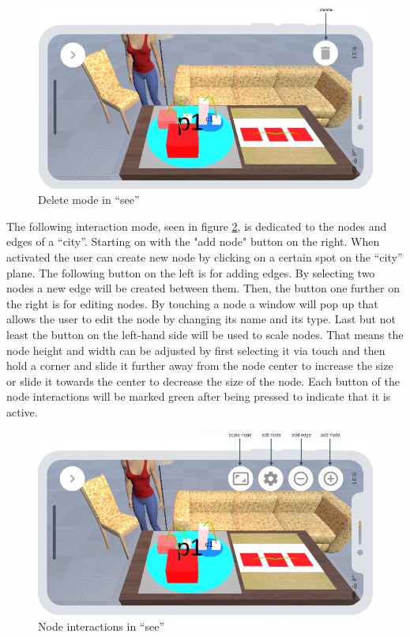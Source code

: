 \begin{figure}[htb]
    \centering
    \includegraphics[width=1\textwidth]{Concept/img/menu2.png}
    \caption{Delete mode in \enquote{\gls{see}}}\label{fig:delete}
\end{figure}

The following interaction mode, seen in figure \ref{fig:nodes}, is dedicated to the nodes and edges of a \enquote{\gls{city}}.
Starting on with the "add node" button on the right.
When activated the user can create new node by clicking on a certain spot on the \enquote{\gls{city}} plane. 
The following button on the left is for adding edges.
By selecting two nodes a new edge will be created between them. 
Then, the button one further on the right is for editing nodes.
By touching a node a window will pop up that allows the user to edit the node by changing its name and its type.
Last but not least the button on the left-hand side will be used to scale nodes.
That means the node height and width can be adjusted by first selecting it via touch and then hold a corner and slide it further away from the node center to increase the size or slide it towards the center to decrease the size of the node.
Each button of the node interactions will be marked green after being pressed to indicate that it is active.

\begin{figure}[htb]
    \centering
    \includegraphics[width=1\textwidth]{Concept/img/menu3.png}
    \caption{Node interactions in \enquote{\gls{see}}}\label{fig:nodes}
\end{figure}

